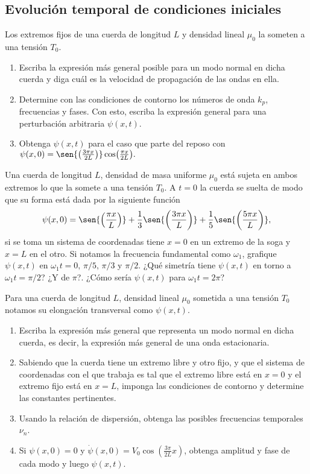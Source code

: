 \subsection*{Evolución temporal de condiciones iniciales}

\item Los extremos fijos de una cuerda de longitud $L$ y densidad lineal $\mu_0$ la someten a una tensión $T_0$.
\begin{enumerate}
	\item Escriba la expresión más general posible para un modo normal en dicha cuerda y diga cuál es la velocidad de propagación de las ondas en ella.
	\item Determine con las condiciones de contorno los números de onda $k_p$, frecuencias y fases.
	Con esto, escriba la expresión general para una perturbación arbitraria $\psi(x,t)$.
	\item Obtenga $\psi(x,t)$ para el caso que parte del reposo con
	$
	\psi(x,0) = \sen{\left( \frac{3\pi x}{2L} \right)} \cos( \frac{\pi x}{2L} ).
	$
\end{enumerate}


\item Una cuerda de longitud $L$, densidad de masa uniforme $\mu_{0}$ está sujeta en ambos extremos lo que la somete a una tensión $T_{0}$.
A $t=0$ la cuerda se suelta de modo que su forma está dada por la siguiente función
$$
\psi(x,0) = \sen{ \left(\frac{\pi x}{L} \right) } + \frac{1}{3} \sen{ \left( \frac{3\pi x}{L} \right) } + \frac{1}{5} \sen{ \left( \frac{5\pi x}{L} \right) },
$$
si se toma un sistema de coordenadas tiene $x=0$ en un extremo de la soga y $x = L$ en el otro. 
	Si notamos la frecuencia fundamental como $\omega_{1}$, grafique $\psi(x,t)$ en $\omega_1 t = 0,\,\pi/5,\,\pi/3$ y $\pi/2$.
	¿Qué simetría tiene $\psi(x,t)$ en torno a $\omega_1 t = \pi/2$?
	¿Y de $\pi$?.
	¿Cómo sería $\psi(x,t)$ para $\omega_1 t = 2 \pi$?


\item Para una cuerda de longitud $L$, densidad lineal $\mu_{0}$ sometida a una tensión $T_0$ notamos su elongación transversal como $\psi(x,t)$.
\begin{enumerate}
	\item Escriba la expresión más general que representa un modo normal en
dicha cuerda, es decir, la expresión más general de una onda estacionaria.
	\item Sabiendo que la cuerda tiene un extremo libre y otro fijo, y que el
sistema de coordenadas con el que trabaja es tal que el extremo libre
está en $x=0$ y el extremo fijo está en $x=L$, imponga las condiciones
de contorno y determine las constantes pertinentes.
	\item Usando la relación de dispersión, obtenga las posibles frecuencias
temporales $\nu_{n}$. 
	\item Si $\psi(x,0)=0$ y $\dot{\psi}(x,0)=V_{0}\cos\left(\frac{3\pi}{2L}x\right)$, obtenga amplitud y fase de cada modo y luego $\psi(x,t)$.
\end{enumerate}


